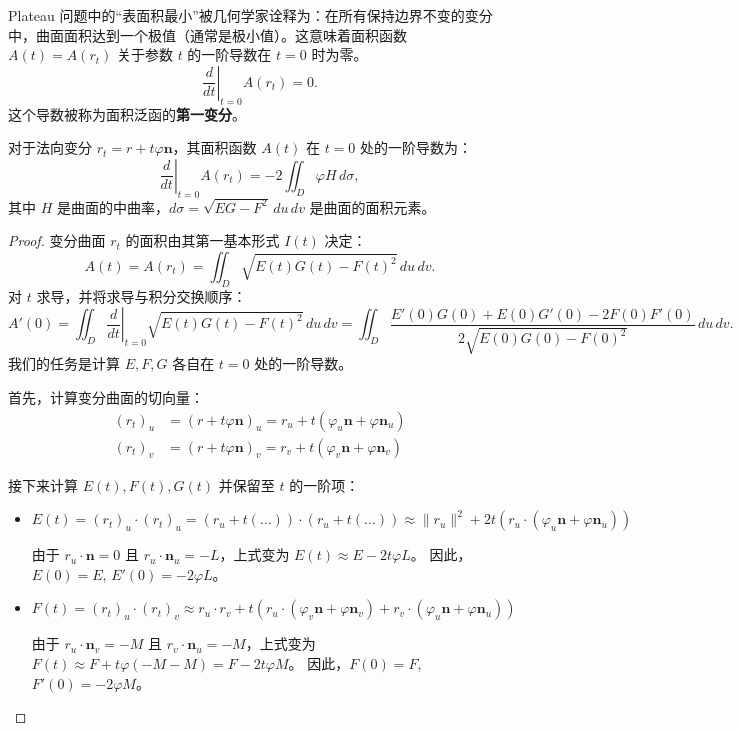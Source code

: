 \documentclass[lang=cn,10pt,thmcnt=section]{elegantbook}
\renewcommand{\vec}[1]{\mathbf{#1}}
\begin{document}
Plateau 问题中的“表面积最小”被几何学家诠释为：在所有保持边界不变的变分中，曲面面积达到一个极值（通常是极小值）。这意味着面积函数 $A(t) = A(r_t)$ 关于参数 $t$ 的一阶导数在 $t=0$ 时为零。
\[
\left. \frac{d}{dt} \right|_{t=0} A(r_t) = 0.
\]
这个导数被称为面积泛函的\textbf{第一变分}。

\begin{proposition}[面积的第一变分公式]
    对于法向变分 $r_t = r + t \varphi \vec{n}$，其面积函数 $A(t)$ 在 $t=0$ 处的一阶导数为：
    \[
    \left. \frac{d}{dt} \right|_{t=0} A(r_t) = -2 \iint_D \varphi H \, d\sigma,
    \]
    其中 $H$ 是曲面的中曲率，$d\sigma = \sqrt{EG - F^2} \, du \, dv$ 是曲面的面积元素。
\end{proposition}

\begin{proof}
    变分曲面 $r_t$ 的面积由其第一基本形式 $I(t)$ 决定：
    \[
    A(t) = A(r_t) = \iint_D \sqrt{E(t)G(t) - F(t)^2} \, du \, dv.
    \]
    对 $t$ 求导，并将求导与积分交换顺序：
    \[
    A'(0) = \iint_D \left. \frac{d}{dt} \right|_{t=0} \sqrt{E(t)G(t) - F(t)^2} \, du \, dv = \iint_D \frac{E'(0)G(0) + E(0)G'(0) - 2F(0)F'(0)}{2\sqrt{E(0)G(0) - F(0)^2}} \, du \, dv.
    \]
    我们的任务是计算 $E,F,G$ 各自在 $t=0$ 处的一阶导数。
    
    首先，计算变分曲面的切向量：
    \begin{align*}
        (r_t)_u &= (r + t \varphi \vec{n})_u = r_u + t (\varphi_u \vec{n} + \varphi \vec{n}_u) \\
        (r_t)_v &= (r + t \varphi \vec{n})_v = r_v + t (\varphi_v \vec{n} + \varphi \vec{n}_v)
    \end{align*}
    
    接下来计算 $E(t), F(t), G(t)$ 并保留至 $t$ 的一阶项：
    \begin{itemize}
        \item $E(t) = (r_t)_u \cdot (r_t)_u = (r_u + t(\dots)) \cdot (r_u + t(\dots)) \approx \|r_u\|^2 + 2t (r_u \cdot (\varphi_u \vec{n} + \varphi \vec{n}_u))$
        
        由于 $r_u \cdot \vec{n} = 0$ 且 $r_u \cdot \vec{n}_u = -L$，上式变为 $E(t) \approx E - 2t\varphi L$。
        因此，$E(0)=E$, $E'(0) = -2\varphi L$。
        
        \item $F(t) = (r_t)_u \cdot (r_t)_v \approx r_u \cdot r_v + t(r_u \cdot (\varphi_v \vec{n} + \varphi \vec{n}_v) + r_v \cdot (\varphi_u \vec{n} + \varphi \vec{n}_u))$
        
        由于 $r_u \cdot \vec{n}_v = -M$ 且 $r_v \cdot \vec{n}_u = -M$，上式变为 $F(t) \approx F + t\varphi(-M-M) = F - 2t\varphi M$。
        因此，$F(0)=F$, $F'(0) = -2\varphi M$。
        

\end{itemize}
\end{proof}
\end{document}
